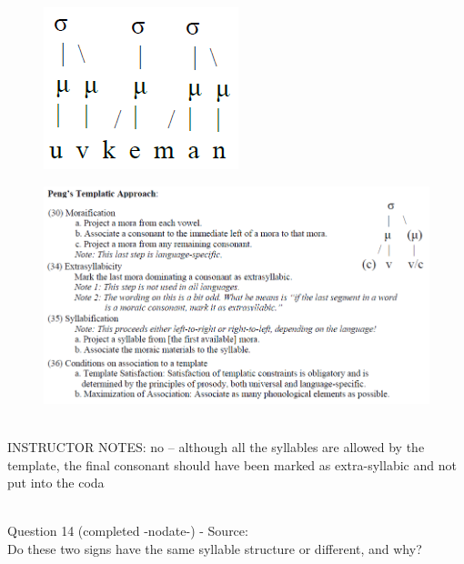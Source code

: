 \documentclass[12pt]{article}
\begin{document}
\begin{figure}[H]
\includegraphics{../images/pengtemplate_uvkeman_no.png}
\end{figure}
\begin{figure}[H]
\includegraphics{../images/peng_template_withdiagram.png}
\end{figure}

~\\
INSTRUCTOR NOTES: no -- although all the syllables are allowed by the template, the final consonant should have been marked as extra-syllabic and not put into the coda


~\\

{\large Question 14} (completed -nodate-) - Source: \\

Do these two signs have the same syllable structure or different, and why?\\
\end{document}
